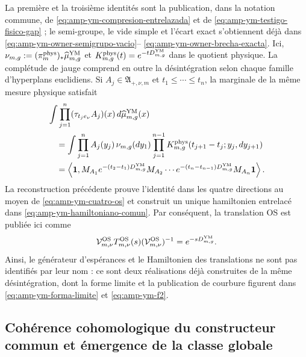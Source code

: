 La première et la troisième identités sont la publication, dans la notation
commune, de \eqref{eq:amp-ym-compresion-entrelazada} et de
\eqref{eq:amp-ym-testigo-fisico-gap} ; le semi-groupe, le vide simple et
l’écart exact s’obtiennent déjà dans
\eqref{eq:amp-ym-owner-semigrupo-vacio}--
\eqref{eq:amp-ym-owner-brecha-exacta}. Ici,
$\nu_{m,g}:=(\pi_m^{\rm phys})_*\widehat\mu_{m,g}^{\rm YM}$ et
$K_{m,g}^{\rm phys}(t)=e^{-tD_{m,g}^{\rm YM}}$ dans le quotient physique.
La complétude de jauge comprend en outre la désintégration selon chaque famille
d’hyperplans euclidiens. Si $A_j\in\mathfrak A_{+,\nu,m}$ et
$t_1\le\cdots\le t_n$, la marginale de la même mesure physique satisfait
\begin{equation}\label{eq:pdf2-g-gau-transfer-euclidean-dato}
\begin{aligned}
 &\int\prod_{j=1}^n
   (\tau_{t_je_\nu}A_j)(x)\,d\widehat\mu_{m,g}^{\rm YM}(x)\\
 &\quad=
 \int\prod_{j=1}^nA_j(y_j)\,
  \nu_{m,g}(dy_1)
  \prod_{j=1}^{n-1}K_{m,g}^{\rm phys}
       (t_{j+1}-t_j;y_j,dy_{j+1})\\
 &\quad=
 \left\langle\mathbf1,
  M_{A_1}e^{-(t_2-t_1)D_{m,g}^{\rm YM}}M_{A_2}\cdots
  e^{-(t_n-t_{n-1})D_{m,g}^{\rm YM}}M_{A_n}\mathbf1
 \right\rangle.
\end{aligned}
\end{equation}
La reconstruction précédente prouve l’identité dans les quatre directions
au moyen de \eqref{eq:amp-ym-cuatro-os} et construit un unique hamiltonien
entrelacé dans \eqref{eq:amp-ym-hamiltoniano-comun}. Par conséquent, la
translation OS est publiée ici comme
\begin{equation}\label{eq:pdf2-g-gau-os-generator-dato}
 \mathcal V_{m,\nu}^{\rm OS}T_{m,\nu}^{\rm OS}(s)
 (\mathcal V_{m,\nu}^{\rm OS})^{-1}
 =e^{-sD_{m,g}^{\rm YM}}.
\end{equation}
Ainsi, le générateur d’espérances et le Hamiltonien des translations ne sont pas
identifiés par leur nom : ce sont deux réalisations déjà construites de la même
désintégration, dont la forme limite et la publication de courbure figurent dans
\eqref{eq:amp-ym-forma-limite} et \eqref{eq:amp-ym-f2}.

\subsection{Cohérence cohomologique du constructeur commun et émergence de la classe globale}

